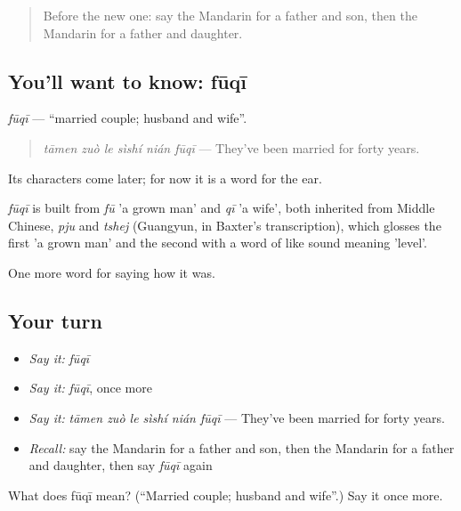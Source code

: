 \begin{quote}
Before the new one: say the Mandarin for a father and son, then the Mandarin for a father and daughter.
\end{quote}

\subsection*{You'll want to know: fūqī}
\emph{fūqī} — \textquotedblleft{}married couple; husband and wife\textquotedblright{}.

\begin{quote}
\emph{tāmen zuò le sìshí nián fūqī} — They've been married for forty years.
\end{quote}

Its characters come later; for now it is a word for the ear.

\begin{cousinweb}
\emph{fūqī} is built from \emph{fū} 'a grown man' and \emph{qī} 'a wife', both inherited from Middle Chinese, \emph{pju} and \emph{tshej} (Guangyun, in Baxter's transcription), which glosses the first 'a grown man' and the second with a word of like sound meaning 'level'.
\end{cousinweb}

\begin{grammarlens}[title={What you've built}]
One more word for saying how it was.
\end{grammarlens}

\subsection*{Your turn}
\begin{itemize}
\raggedright
  \item \emph{Say it:} \emph{fūqī}
  \item \emph{Say it:} \emph{fūqī}, once more
  \item \emph{Say it:} \emph{tāmen zuò le sìshí nián fūqī} — They've been married for forty years.
  \item \emph{Recall:} say the Mandarin for a father and son, then the Mandarin for a father and daughter, then say \emph{fūqī} again
\end{itemize}

\begin{tcolorbox}[breakable,colback=teal!4,colframe=teal!35!black,title={Before you move on}]
What does fūqī mean? (\textquotedblleft{}Married couple; husband and wife\textquotedblright{}.) Say it once more.
\end{tcolorbox}
